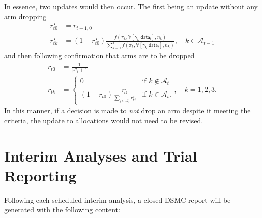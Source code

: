 \documentclass[11pt,parskip=half-]{scrartcl}
\begin{document}
In essence, two updates would then occur. The first being an update without any arm dropping
$$
  \begin{aligned}
    r_{t0}^\star & = r_{t-1,0}                                                                                                                                                                 \\
    r_{tk}^\star & = (1 - r_{t0}^\star)\frac{f(\pi_k, \mathbb V[\gamma_k|\mathsf{data}_t], n_k)}{\sum_{k=1}^3 f(\pi_k, \mathbb V[\gamma_k|\mathsf{data}_t], n_k)}, \quad k\in\mathcal{A}_{t-1}
  \end{aligned}
$$
and then following confirmation that arms are to be dropped
$$
  \begin{aligned}
    r_{t0} & = \frac{1}{|\mathcal{A}_t + 1}               \\
    r_{tk} & = \begin{cases}
      0                                                                       & \text{if } k \notin \mathcal{A}_t \\
      (1 - r_{t0}) \frac{r_{tk}^\star}{\sum_{j\in\mathcal{A}_t} r_{tj}^\star} & \text{if } k \in \mathcal{A}_t.
    \end{cases}, \quad k=1,2,3.
  \end{aligned}
$$
In this manner, if a decision is made to \emph{not} drop an arm despite it meeting the criteria, the update to allocations would not need to be revised.

\clearpage

\section{Interim Analyses and Trial Reporting}\label{interim-analyses-and-trial-reporting}

Following each scheduled interim analysis, a closed DSMC report will be generated with the following content:
\end{document}
